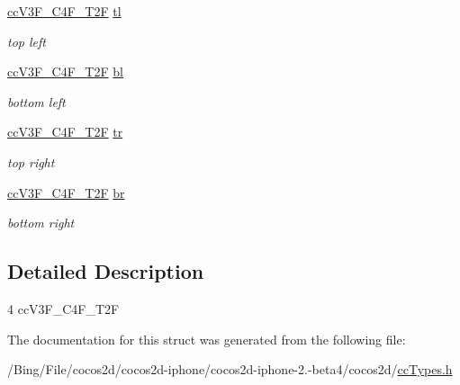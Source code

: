 \begin{DoxyCompactItemize}
\item 
\hypertarget{struct__cc_v3_f___c4_f___t2_f___quad_a272a3f177c91248a205d8992efc63b30}{\hyperlink{cc_types_8h_a9348d6a0d5bc04b1a161bb4b6e33d422}{cc\-V3\-F\-\_\-\-C4\-F\-\_\-\-T2\-F} \hyperlink{struct__cc_v3_f___c4_f___t2_f___quad_a272a3f177c91248a205d8992efc63b30}{tl}}\label{struct__cc_v3_f___c4_f___t2_f___quad_a272a3f177c91248a205d8992efc63b30}

\begin{DoxyCompactList}\small\item\em top left \end{DoxyCompactList}\item 
\hypertarget{struct__cc_v3_f___c4_f___t2_f___quad_a4c19ce71d6715428619948a2d3c908ab}{\hyperlink{cc_types_8h_a9348d6a0d5bc04b1a161bb4b6e33d422}{cc\-V3\-F\-\_\-\-C4\-F\-\_\-\-T2\-F} \hyperlink{struct__cc_v3_f___c4_f___t2_f___quad_a4c19ce71d6715428619948a2d3c908ab}{bl}}\label{struct__cc_v3_f___c4_f___t2_f___quad_a4c19ce71d6715428619948a2d3c908ab}

\begin{DoxyCompactList}\small\item\em bottom left \end{DoxyCompactList}\item 
\hypertarget{struct__cc_v3_f___c4_f___t2_f___quad_ae283d8a871b8baa9eb11c6682434c313}{\hyperlink{cc_types_8h_a9348d6a0d5bc04b1a161bb4b6e33d422}{cc\-V3\-F\-\_\-\-C4\-F\-\_\-\-T2\-F} \hyperlink{struct__cc_v3_f___c4_f___t2_f___quad_ae283d8a871b8baa9eb11c6682434c313}{tr}}\label{struct__cc_v3_f___c4_f___t2_f___quad_ae283d8a871b8baa9eb11c6682434c313}

\begin{DoxyCompactList}\small\item\em top right \end{DoxyCompactList}\item 
\hypertarget{struct__cc_v3_f___c4_f___t2_f___quad_a9440837a8b8095de560171d4692f34d3}{\hyperlink{cc_types_8h_a9348d6a0d5bc04b1a161bb4b6e33d422}{cc\-V3\-F\-\_\-\-C4\-F\-\_\-\-T2\-F} \hyperlink{struct__cc_v3_f___c4_f___t2_f___quad_a9440837a8b8095de560171d4692f34d3}{br}}\label{struct__cc_v3_f___c4_f___t2_f___quad_a9440837a8b8095de560171d4692f34d3}

\begin{DoxyCompactList}\small\item\em bottom right \end{DoxyCompactList}\end{DoxyCompactItemize}


\subsection{Detailed Description}
4 cc\-V3\-F\-\_\-\-C4\-F\-\_\-\-T2\-F 

The documentation for this struct was generated from the following file\-:\begin{DoxyCompactItemize}
\item 
/\-Bing/\-File/cocos2d/cocos2d-\/iphone/cocos2d-\/iphone-\/2.-\/beta4/cocos2d/\hyperlink{cc_types_8h}{cc\-Types.\-h}\end{DoxyCompactItemize}
